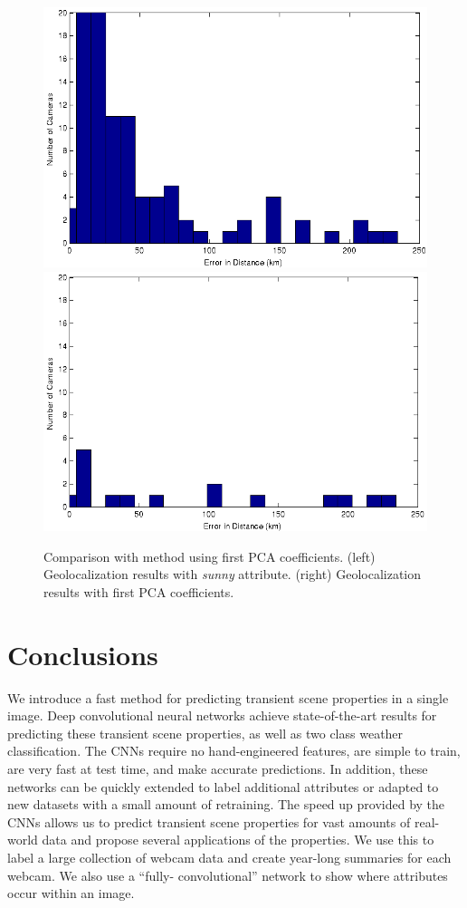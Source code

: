 \documentclass[10pt,twocolumn,letterpaper]{article}
\begin{document}
\begin{figure}
  \centering
  \includegraphics[width=.235\textwidth]{figs/geoloc/tran_errors}
  \includegraphics[width=.235\textwidth]{figs/geoloc/pca_errors}
  \caption{Comparison with method using first PCA coefficients. (left)
    Geolocalization results with \textit{sunny} attribute. (right)
    Geolocalization results with first PCA coefficients.}
  \label{fig:locerror}
\end{figure}



\section{Conclusions}
We introduce a fast method for predicting transient scene properties in a
single image.  Deep convolutional neural networks achieve state-of-the-art
results for predicting these transient scene properties, as well as two class
weather classification.  The CNNs require no hand-engineered features, are
simple to train, are very fast at test time, and make accurate predictions. In
addition, these networks can be quickly extended to label additional attributes
or adapted to new datasets with a small amount of retraining.  The speed up
provided by the CNNs allows us to predict transient scene properties for vast
amounts of real-world data and propose several applications of the properties.
We use this to label a large collection of webcam data and create year-long
summaries for each webcam.  We also use a ``fully- convolutional'' network to
show where attributes occur within an image.

%

{\small


}
\end{document}
